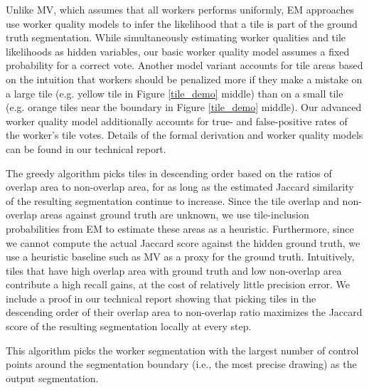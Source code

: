\par \noindent Unlike MV, which assumes that all workers performs uniformly, EM approaches use worker quality models to infer the likelihood that a tile is part of the ground truth segmentation. While simultaneously estimating worker qualities and tile likelihoods as hidden variables, 
our basic worker quality model assumes a fixed probability for a correct vote.
Another model variant accounts for tile areas based on the intuition that workers should be penalized more if they make a mistake on a large tile (e.g. yellow tile in Figure \ref{tile_demo} middle) than on a small tile (e.g. orange tiles near the boundary in Figure \ref{tile_demo} middle). Our advanced %
worker quality model additionally accounts for true- and false-positive rates of the worker's tile votes. Details of the formal derivation and worker quality models can be found in our technical report.
\par \noindent The greedy algorithm picks tiles in descending order based on the ratios of overlap area to non-overlap area, for as long as the estimated Jaccard similarity of the resulting segmentation continue to increase. Since the tile overlap and non-overlap areas against ground truth are unknown, we use tile-inclusion probabilities from EM to estimate these areas as a heuristic. Furthermore, since we cannot compute the actual Jaccard score against the hidden ground truth, we use a heuristic baseline such as MV as a proxy for the ground truth. Intuitively, tiles that have high overlap area with ground truth and low non-overlap area contribute a high recall gains, at the cost of relatively little precision error. We include a proof in our technical report showing that picking tiles in the descending order of their overlap area to non-overlap ratio maximizes the Jaccard score of the resulting segmentation locally at every step. 

\par \noindent This algorithm picks the worker segmentation with the largest number of control points around the segmentation boundary (i.e., the most precise drawing) as the output segmentation.


